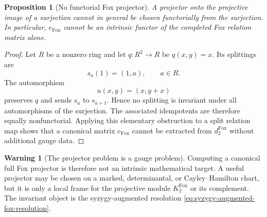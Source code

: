\documentclass[11pt]{article}
\newtheorem{proposition}[theorem]{Proposition}
\theoremstyle{definition}
\newtheorem{warning}[theorem]{Warning}
\begin{document}
\begin{proposition}[No functorial Fox projector]\label{prop:no-functorial-fox-projector}
A projector onto the projective image of a surjection cannot in general be
chosen functorially from the surjection.  In particular,
$e_{\mathrm{Fox}}$ cannot be an intrinsic functor of the completed Fox
relation matrix alone.
\end{proposition}

\begin{proof}
Let $R$ be a nonzero ring and let $q:R^2\to R$ be $q(x,y)=x$.  Its splittings
are
\[
s_a(1)=(1,a),\qquad a\in R.
\]
The automorphism
\[
u(x,y)=(x,y+x)
\]
preserves $q$ and sends $s_a$ to $s_{a+1}$.  Hence no splitting is invariant
under all automorphisms of the surjection.  The associated idempotents are
therefore equally nonfunctorial.  Applying this elementary obstruction to a
split relation map shows that a canonical matrix $e_{\mathrm{Fox}}$ cannot
be extracted from $d_2^{\mathrm{Fox}}$ without additional gauge data.
\end{proof}

\begin{warning}[The projector problem is a gauge problem]\label{warn:fox-projector-gauge}
Computing a canonical full Fox projector is therefore not an intrinsic mathematical target.  A useful projector may be
chosen on a marked, determinantal, or Cayley--Hamilton chart, but it is only
a local frame for the projective module $K_2^{\mathrm{Fox}}$ or its
complement.  The invariant object is the syzygy-augmented resolution
\eqref{eq:syzygy-augmented-fox-resolution}.
\end{warning}
\end{document}

